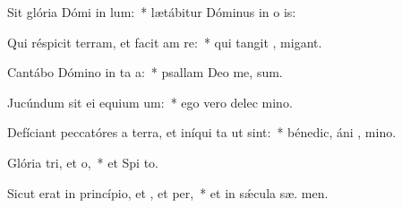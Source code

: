 \item Sit glória Dómi in lum:~* lætábitur Dóminus in o is:
\item Qui réspicit terram, et facit am re:~* qui tangit ,  migant.
\item Cantábo Dómino in ta a:~* psallam Deo me,  sum.
\item Jucúndum sit ei equium um:~* ego vero delec  mino.
\item Defíciant peccatóres a terra, et iníqui ta ut  sint:~* bénedic, áni , mino.
\item Glória tri, et o,~* et Spi to.
\item Sicut erat in princípio, et , et per,~* et in sǽcula sæ. men.
